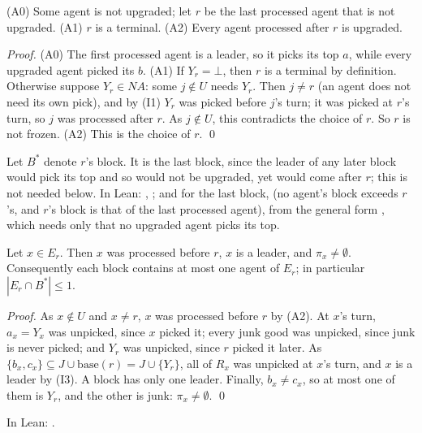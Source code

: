 \documentclass[runningheads,11pt]{llncs}
\newcommand{\NA}{\mathit{NA}}
\newcommand{\base}{\mathrm{base}}
\newcommand{\none}{\bot}
\begin{document}
\begin{lemma}\label{lem:r}
(A0) Some agent is not upgraded; let $r$ be the last processed agent that is not upgraded. (A1) $r$ is a terminal. (A2) Every agent processed after $r$ is upgraded.
\end{lemma}

\begin{proof}
(A0) The first processed agent is a leader, so it picks its top $a$, while every upgraded agent picked its $b$.
(A1) If $Y_r=\none$, then $r$ is a terminal by definition. Otherwise suppose $Y_r\in\NA$: some $j\notin U$ needs $Y_r$. Then $j\ne r$ (an agent does not need its own pick), and by (I1) $Y_r$ was picked before $j$'s turn; it was picked at $r$'s turn, so $j$ was processed after $r$. As $j\notin U$, this contradicts the choice of $r$. So $r$ is not frozen.
(A2) This is the choice of $r$. \qed
\end{proof}

\noindent Let $B^*$ denote $r$'s block. It is the last block, since the leader of any later block would pick its top and so would not be upgraded, yet would come after $r$; this is not needed below. In Lean: , ; and for the last block,  (no agent's block exceeds $r$'s, and $r$'s block is that of the last processed agent), from the general form , which needs only that no upgraded agent picks its top.

\begin{lemma}\label{lem:lead}
Let $x\in E_r$. Then $x$ was processed before $r$, $x$ is a leader, and $\pi_x\ne\emptyset$. Consequently each block contains at most one agent of $E_r$; in particular $|E_r\cap B^*|\le1$.
\end{lemma}

\begin{proof}
As $x\notin U$ and $x\ne r$, $x$ was processed before $r$ by (A2). At $x$'s turn, $a_x=Y_x$ was unpicked, since $x$ picked it; every junk good was unpicked, since junk is never picked; and $Y_r$ was unpicked, since $r$ picked it later. As $\{b_x,c_x\}\subseteq J\cup\base(r)=J\cup\{Y_r\}$, all of $R_x$ was unpicked at $x$'s turn, and $x$ is a leader by (I3). A block has only one leader. Finally, $b_x\ne c_x$, so at most one of them is $Y_r$, and the other is junk: $\pi_x\ne\emptyset$. \qed
\end{proof}

\noindent In Lean: .
\end{document}
